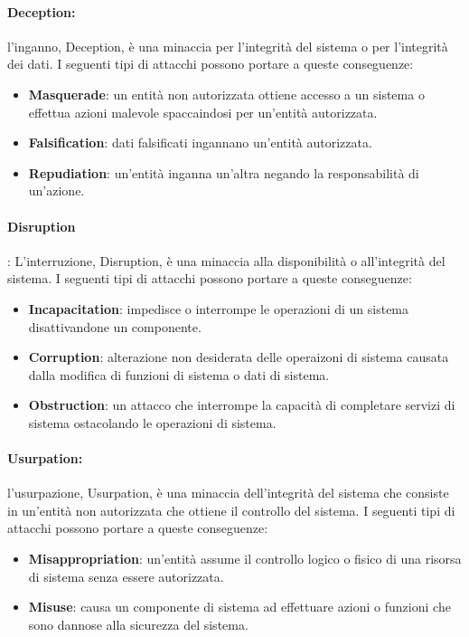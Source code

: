 \paragraph{Deception: } l'inganno, Deception, è una minaccia per l'integrità
del sistema o per l'integrità dei dati.
I seguenti tipi di attacchi possono portare a queste conseguenze:

\begin{itemize}
    \item \textbf{Masquerade}: un entità non autorizzata ottiene accesso a un sistema
          o effettua azioni malevole spaccaindosi per un'entità autorizzata.
    \item \textbf{Falsification}: dati falsificati ingannano un'entità autorizzata.
    \item \textbf{Repudiation}: un'entità inganna un'altra negando la responsabilità
          di un'azione.
\end{itemize}

\paragraph{Disruption}: L'interruzione, Disruption, è una minaccia alla
disponibilità o all'integrità del sistema.
I seguenti tipi di attacchi possono portare a queste conseguenze:

\begin{itemize}
    \item \textbf{Incapacitation}: impedisce o interrompe le operazioni di un sistema
          disattivandone un componente.
    \item \textbf{Corruption}: alterazione non desiderata delle operaizoni di
          sistema causata dalla modifica di funzioni di sistema o dati di sistema.
    \item \textbf{Obstruction}: un attacco che interrompe la capacità di
          completare servizi di sistema ostacolando le operazioni di sistema.
\end{itemize}

\paragraph{Usurpation: } l'usurpazione, Usurpation, è una minaccia dell'integrità
del sistema che consiste in un'entità non autorizzata che ottiene il controllo
del sistema.
I seguenti tipi di attacchi possono portare a queste conseguenze:

\begin{itemize}
    \item \textbf{Misappropriation}: un'entità assume il controllo logico o fisico
          di una risorsa di sistema senza essere autorizzata.
    \item \textbf{Misuse}: causa un componente di sistema ad effettuare azioni o
          funzioni che sono dannose alla sicurezza del sistema.
\end{itemize}

